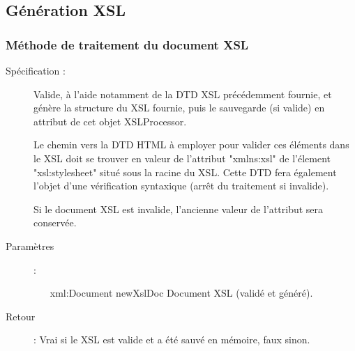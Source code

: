 \documentclass[10pt,a4paper]{article}
\begin{document}
\subsection{Génération XSL}
\subsubsection{Méthode de traitement du document XSL}
\begin{description}
\item[Spécification :] Valide, à l’aide notamment de la DTD XSL précédemment fournie, et génère la structure du XSL fournie, puis le sauvegarde (si valide) en attribut de cet objet XSLProcessor.

Le chemin vers la DTD HTML à employer pour valider ces éléments dans le XSL doit se trouver en valeur de l’attribut "xmlns:xsl" de l’élement "xsl:stylesheet" situé sous la racine du XSL. Cette DTD fera également l’objet d’une vérification syntaxique (arrêt du traitement si invalide).

Si le document XSL est invalide, l’ancienne valeur de l’attribut sera conservée.

\item[Paramètres] :
\begin{itemize}
\item[xml:Document newXslDoc] Document XSL (validé et généré).
\end{itemize}

\item[Retour] : Vrai si le XSL est valide et a été sauvé en mémoire, faux sinon.
\end{description}
\end{document}
